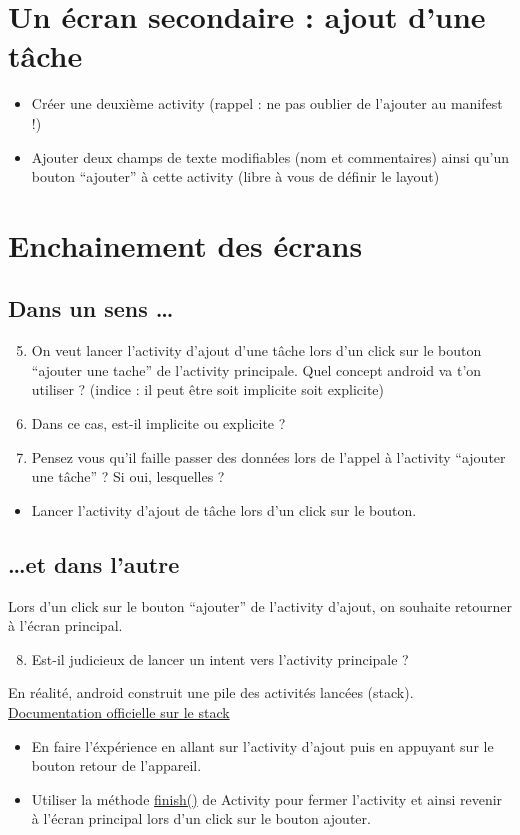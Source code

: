 \documentclass{article}
\begin{document}
\section{Un écran secondaire : ajout d'une tâche}
\begin{itemize}
  \item Créer une deuxième activity (rappel : ne pas oublier de l'ajouter au manifest !)
  \item Ajouter deux champs de texte modifiables (nom et commentaires) ainsi
  qu'un bouton ``ajouter'' à cette activity (libre à vous de définir le layout)
\end{itemize}
\section{Enchainement des écrans}
\subsection{Dans un sens \ldots}
\begin{enumerate}
 \setcounter{enumi}{4}
\item On veut lancer l'activity d'ajout d'une tâche lors d'un click sur le
bouton ``ajouter une tache'' de l'activity principale.
Quel concept android va t'on utiliser ? (indice : il peut être soit implicite soit explicite)
\item Dans ce cas, est-il implicite ou explicite ?
\item Pensez vous qu'il faille passer des données lors de l'appel à l'activity ``ajouter une tâche'' ? Si oui, lesquelles ?
\end{enumerate}
\begin{itemize}
  \item Lancer l'activity d'ajout de tâche lors d'un click sur le bouton.
\end{itemize}
\subsection{\ldots et dans l'autre}

Lors d'un click sur le bouton ``ajouter'' de l'activity d'ajout, on souhaite retourner à l'écran principal.
 \begin{enumerate}
 \setcounter{enumi}{7}
\item Est-il judicieux de lancer un intent vers l'activity principale ? 
\end{enumerate}
 En réalité, android construit une pile des activités lancées (stack). \href{http://developer.android.com/guide/components/tasks-and-back-stack.html}{Documentation officielle sur le stack} 
  \begin{itemize}
  \item En faire l'éxpérience en allant sur l'activity d'ajout puis en appuyant
  sur le bouton retour de l'appareil.
  \item Utiliser la méthode
  \href{http://developer.android.com/reference/android/app/Activity.html#finish()}{finish()} de Activity pour fermer l'activity et ainsi revenir à l'écran principal lors d'un click sur le bouton ajouter.
 \end{itemize}
 
\end{document}
